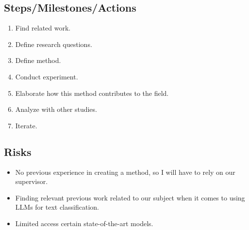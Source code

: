 \subsection{Steps/Milestones/Actions}

\begin{enumerate}
    \item Find related work.

    \item Define research questions.

    \item Define method.

    \item Conduct experiment.

    \item Elaborate how this method contributes to the field.

    \item Analyze with other studies.

    \item Iterate.
\end{enumerate}

\subsection{Risks}

\begin{itemize}
    \item No previous experience in creating a method, so I will have to rely on
        our supervisor.

    \item Finding relevant previous work related to our subject when it comes to
        using LLMs for text classification.

    \item Limited access certain state-of-the-art models.
\end{itemize}